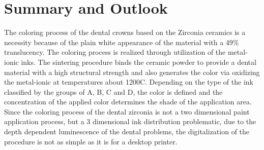 \cleardoublepage
{}


\chapter{Summary and Outlook}
The coloring process of the dental crowns based on the Zirconia ceramics is a necessity because of the plain white appearance of the material with a 49\% translucency. The coloring process is realized through utilization of the metal-ionic inks. The sintering procedure binds the ceramic powder to provide a dental material with a high structural strength and also generates the color via oxidizing the metal-ionic at temperatures about 1200\textdegree C. Depending on the type of the ink classified by the groups of A, B, C and D, the color is defined and the concentration of the applied color determines the shade of the application area. Since the coloring process of the dental zirconia is not a two dimensional paint application process, but a 3 dimensional ink distribution problematic, due to the depth dependent luminescence of the dental problems, the digitalization of the procedure is not as simple as it is for a desktop printer. 

